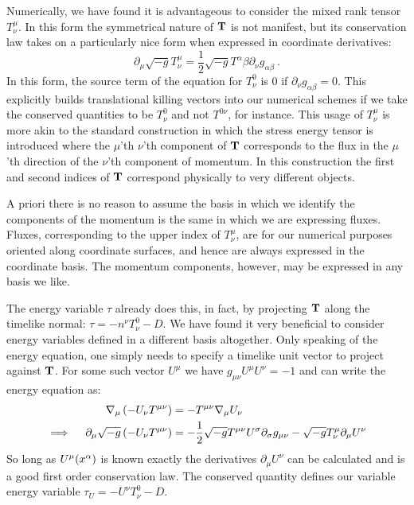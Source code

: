 Numerically, we have found it is advantageous to consider the mixed rank tensor $T^\mu_\nu$.  In this form the symmetrical nature of ${\bf T}$ is not manifest, but its conservation law takes on a particularly nice form when expressed in coordinate derivatives:
\begin{equation}
	\partial_\mu \sqrt{-g} T^\mu_\nu = \frac{1}{2}\sqrt{-g}T^{\alpha}{\beta}\partial_\nu g_{\alpha \beta}\ .
\end{equation}
In this form, the source term of the equation for $T^0_\nu$ is 0 if $\partial_\nu g_{\alpha \beta} = 0$.  This explicitly builds translational killing vectors into our numerical schemes if we take the conserved quantities to be $T^0_\nu$ and not $T^{0\nu}$, for instance.  This usage of $T^\mu_\nu$ is more akin to the standard construction in which the stress energy tensor is introduced where the $\mu$'th $\nu$'th component of ${\bf T}$ corresponds to the flux in the $\mu$'th direction of the $\nu$'th component of momentum.  In this construction the first and second indices of ${\bf T}$ correspond physically to very different objects.

A priori there is no reason to assume the basis in which we identify the components of the momentum is the same in which we are expressing fluxes.  Fluxes, corresponding to the upper index of $T^\mu_\nu$, are for our numerical purposes oriented along coordinate surfaces, and hence are always expressed in the coordinate basis.  The momentum components, however, may be expressed in any basis we like.  

The energy variable $\tau$ already does this, in fact, by projecting ${\bf T}$ along the timelike normal: $\tau = -n^\nu T^0_\nu - D$.  We have found it very beneficial to consider energy variables defined in a different basis altogether.  Only speaking of the energy equation, one simply needs to specify a timelike unit vector to project against ${\bf T}$.  For some such vector $U^\mu$ we have $g_{\mu\nu}U^\mu U^\nu = -1$ and can write the energy equation as:
\begin{align}
	\nabla_\mu \left( -U_\nu T^{\mu\nu}\right) &= -T^{\mu\nu}\nabla_\mu U_\nu \\
\implies \quad	\partial_\mu \sqrt{-g} \left(-U_\nu T^{\mu\nu}\right) &= -\frac{1}{2}\sqrt{-g}T^{\mu\nu}U^\sig\partial_\sig g_{\mu\nu} - \sqrt{-g}T^\mu_\nu \partial_\mu U^\nu \eqlabel{UTmunu}
\end{align}
So long as $U^\mu(x^\alpha)$ is known exactly the derivatives $\partial_\mu U^\nu$ can be calculated and  is a good first order conservation law.  The conserved quantity defines our variable energy variable $\tau_U = -U^\nu T^0_\nu - D$.

